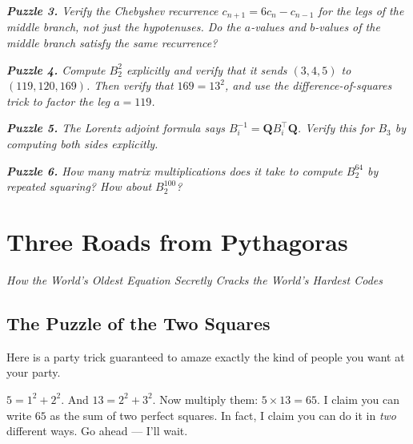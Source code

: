 \documentclass[11pt,openright,twoside]{book}
\renewenvironment{quotation}{%
  \par\vspace{8pt}%
  \begin{list}{}{%
    \setlength{\leftmargin}{2em}%
    \setlength{\rightmargin}{2em}%
  }\item[]\itshape\color{pullquote}%
}{%
  \end{list}%
  \par\vspace{8pt}%
}
\theoremstyle{definition}
\begin{document}
\begin{quotation}
\noindent\itshape \textbf{Puzzle 3.} Verify the Chebyshev recurrence $c_{n+1} = 6c_n - c_{n-1}$ for the \textit{legs} of the middle branch, not just the hypotenuses. Do the $a$-values and $b$-values of the middle branch satisfy the same recurrence?
\end{quotation}

\begin{quotation}
\noindent\itshape \textbf{Puzzle 4.} Compute $B_2^2$ explicitly and verify that it sends $(3, 4, 5)$ to $(119, 120, 169)$. Then verify that $169 = 13^2$, and use the difference-of-squares trick to factor the leg $a = 119$.
\end{quotation}

\begin{quotation}
\noindent\itshape \textbf{Puzzle 5.} The Lorentz adjoint formula says $B_i^{-1} = \mathbf{Q} B_i^\top \mathbf{Q}$. Verify this for $B_3$ by computing both sides explicitly.
\end{quotation}

\begin{quotation}
\noindent\itshape \textbf{Puzzle 6.} How many matrix multiplications does it take to compute $B_2^{64}$ by repeated squaring? How about $B_2^{100}$?
\end{quotation}

\clearpage


\chapter{Three Roads from Pythagoras}
\label{ch:4}

\begin{center}
\textit{How the World's Oldest Equation Secretly Cracks the World's Hardest Codes}
\end{center}
\bigskip




\bigskip


\section{The Puzzle of the Two Squares}

Here is a party trick guaranteed to amaze exactly the kind of people you want at your party.

$5 = 1^2 + 2^2$. And $13 = 2^2 + 3^2$. Now multiply them: $5 \times 13 = 65$. I claim you can write $65$ as the sum of two perfect squares. In fact, I claim you can do it in \textit{two} different ways. Go ahead --- I'll wait.
\end{document}
